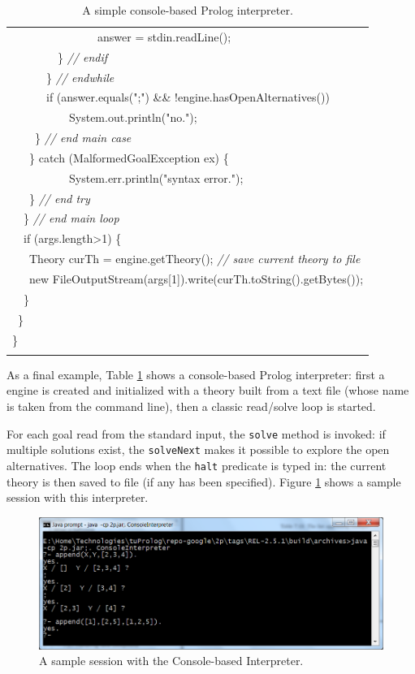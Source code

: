 \begin{table}
\begin{center}
{\begin{tabular}{p{14cm}}
    ~~~~~~~~~~~~~~~answer = stdin.readLine();\\
    ~~~~~~~~\} \textit{// endif}\\
    ~~~~~~\} \textit{// endwhile}\\
    ~~~~~~if (answer.equals(";") \&\& !engine.hasOpenAlternatives())\\
    ~~~~~~~~~~System.out.println("no.");\\
    ~~~~\} \textit{// end main case}\\
    ~~~\} catch (MalformedGoalException ex) \{\\
    ~~~~~~~~~~System.err.println("syntax error.");\\
    ~~~\} \textit{// end try}\\
    ~~\} \textit{// end main loop}\\
    ~~if (args.length>1) \{\\
    ~~~Theory curTh = engine.getTheory(); \textit{// save current theory to file}\\
    ~~~new
    FileOutputStream(args[1]).write(curTh.toString().getBytes());\\
    ~~\}\\
    ~\}\\
    \}\\
    \\\hline
    \end{tabular}}
    \end{center}
    \caption{A simple console-based Prolog interpreter.}
    \label{tab:console-sample}
\end{table}

As a final example, Table \ref{tab:console-sample} shows a console-based Prolog interpreter: first a \tuprolog{} engine is created and initialized with a theory built from a text file (whose name is taken from the command line), then a classic read/solve loop is started.

For each goal read from the standard input, the \texttt{solve} method is invoked: if multiple solutions exist, the \texttt{solveNext} makes it possible to explore the open alternatives.
%
The loop ends when the \texttt{halt} predicate is typed in: the current theory is then saved to file (if any has been specified).
Figure \ref{fig:console-interpreter} shows a sample session with this interpreter.

\begin{figure}
  \centering
  \includegraphics[width=12cm]{images/console-interpreter}
  \caption{A sample session with the Console-based Interpreter.}
  \label{fig:console-interpreter}
\end{figure}


